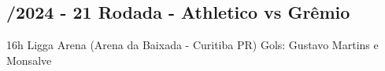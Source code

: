 \newpage
\subsection{/2024 - 21 Rodada - Athletico vs Grêmio}

\begin{figure}[H]
    \centering
    
\end{figure}

16h 
Ligga Arena (Arena da Baixada - Curitiba PR)
Gols: Gustavo Martins e Monsalve